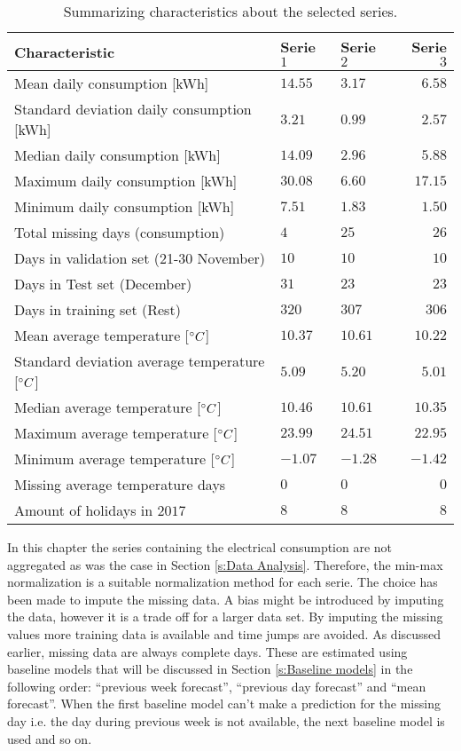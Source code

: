 \begin{table}
  \centering
  \begin{tabular}{@{}l|llr@{}} \toprule
  	\textbf{Characteristic}	& \textbf{Serie $ 1 $} & \textbf{Serie $ 2 $} & \textbf{Serie $ 3 $}\\\midrule
    Mean daily consumption [kWh]& $ 14.55 $&$ 3.17 $  & $ 6.58 $ \\
    Standard deviation daily consumption [kWh] &$ 3.21 $ & $ 0.99 $& $ 2.57 $ \\
    Median daily consumption [kWh] & $ 14.09 $ & $ 2.96 $& $ 5.88 $ \\
    Maximum daily consumption [kWh] & $ 30.08 $ & $ 6.60 $ &  $ 17.15 $   \\
    Minimum daily consumption [kWh]& $ 7.51 $ & $ 1.83 $ &  $ 1.50 $   \\
    Total missing days (consumption) & $ 4 $ &$ 25 $ & $ 26 $\\
    Days in validation set (21-30 November)&  $ 10 $ & $ 10 $  & $ 10 $ \\
    Days in Test set (December) & $ 31 $    &    $ 23 $  & $ 23 $ \\
    Days in training set (Rest)&   $ 320 $  &  $ 307 $   &  $ 306 $\\
    Mean average temperature [$\degree C$]& $ 10.37 $  &  $ 10.61 $  & $ 10.22 $ \\
    Standard deviation average temperature [$\degree C$]& $ 5.09 $  & $ 5.20 $   & $ 5.01 $ \\
    Median average temperature [$\degree C$] &  $ 10.46 $ &  $ 10.61 $  & $ 10.35 $ \\
    Maximum average temperature [$\degree C$] & $ 23.99 $  & $ 24.51 $   & $ 22.95 $ \\ 
    Minimum average temperature [$\degree C$] & $ -1.07 $  &  $ -1.28 $  & $ -1.42 $ \\
    Missing average temperature days &  $ 0 $ & $ 0 $  & $ 0 $  \\ 
    Amount of holidays in $ 2017 $ & $ 8 $  &  $ 8 $  & $ 8 $ \\\bottomrule
  \end{tabular}
  \caption{Summarizing characteristics about the selected series.}
  \label{tab:summ_data}
\end{table}

In this chapter the series containing the electrical consumption are not aggregated as was the case in Section \ref{s:Data Analysis}. Therefore, the min-max normalization is a suitable normalization method for each serie. The choice has been made to impute the missing data. A bias might be introduced by imputing the data, however it is a trade off for a larger data set. By imputing the missing values more training data is available and time jumps are avoided. As discussed earlier, missing data are always complete days. These are estimated using baseline models that will be discussed in Section \ref{s:Baseline models} in the following order: ``previous week forecast'', ``previous day forecast'' and ``mean forecast''. When the first baseline model can't make a prediction for the missing day i.e. the day during previous week is not available, the next baseline model is used and so on.\\

